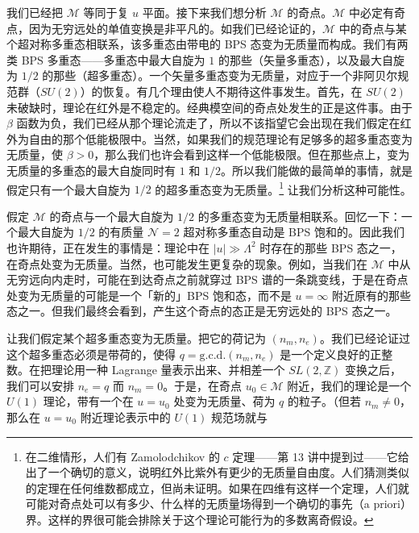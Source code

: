我们已经把 $\mathcal{M}$ 等同于复 $u$ 平面。接下来我们想分析 $\mathcal{M}$ 的奇点。$\mathcal{M}$ 中必定有奇点，因为无穷远处的单值变换是非平凡的。如我们已经论证的，$\mathcal{M}$ 中的奇点与某个超对称多重态相联系，该多重态由带电的 BPS 态变为无质量而构成。我们有两类 BPS 多重态——多重态中最大自旋为 $1$ 的那些（矢量多重态），以及最大自旋为 $1/2$ 的那些（超多重态）。一个矢量多重态变为无质量，对应于一个非阿贝尔规范群（$SU(2)$）的恢复。有几个理由使人不期待这件事发生。首先，在 $SU(2)$ 未破缺时，理论在红外是不稳定的。经典模空间的奇点处发生的正是这件事。由于 $\beta$ 函数为负，我们已经从那个理论流走了，所以不该指望它会出现在我们假定在红外为自由的那个低能极限中。当然，如果我们的规范理论有足够多的超多重态变为无质量，使 $\beta>0$，那么我们也许会看到这样一个低能极限。但在那些点上，变为无质量的多重态的最大自旋同时有 $1$ 和 $1/2$。所以我们能做的最简单的事情，就是假定只有一个最大自旋为 $1/2$ 的超多重态变为无质量。\footnote{在二维情形，人们有 Zamolodchikov 的 $c$ 定理——第 13 讲中提到过——它给出了一个确切的意义，说明红外比紫外有更少的无质量自由度。人们猜测类似的定理在任何维数都成立，但尚未证明。如果在四维有这样一个定理，人们就可能对奇点处可以有多少、什么样的无质量场得到一个确切的事先（a priori）界。这样的界很可能会排除关于这个理论可能行为的多数离奇假设。} 让我们分析这种可能性。

假定 $\mathcal{M}$ 的奇点与一个最大自旋为 $1/2$ 的多重态变为无质量相联系。回忆一下：一个最大自旋为 $1/2$ 的有质量 $\mathcal{N}=2$ 超对称多重态自动是 BPS 饱和的。因此我们也许期待，正在发生的事情是：理论中在 $|u|\gg\Lambda^2$ 时存在的那些 BPS 态之一，在奇点处变为无质量。当然，也可能发生更复杂的现象。例如，当我们在 $\mathcal{M}$ 中从无穷远向内走时，可能在到达奇点之前就穿过 BPS 谱的一条跳变线，于是在奇点处变为无质量的可能是一个「新的」BPS 饱和态，而不是 $u=\infty$ 附近原有的那些态之一。但我们最终会看到，产生这个奇点的态正是无穷远处的 BPS 态之一。

让我们假定某个超多重态变为无质量。把它的荷记为 $(n_m,n_e)$。我们已经论证过这个超多重态必须是带荷的，使得 $q=\mathrm{g.c.d.}(n_m,n_e)$ 是一个定义良好的正整数。在把理论用一种 Lagrange 量表示出来、并相差一个 $SL(2,\mathbb{Z})$ 变换之后，我们可以安排 $n_e=q$ 而 $n_m=0$。于是，在奇点 $u_0\in\mathcal{M}$ 附近，我们的理论是一个 $U(1)$ 理论，带有一个在 $u=u_0$ 处变为无质量、荷为 $q$ 的粒子。（但若 $n_m\neq0$，那么在 $u=u_0$ 附近理论表示中的 $U(1)$ 规范场就与

